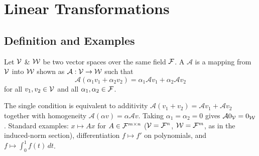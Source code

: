 \section{Linear Transformations}\label{sec:lt}
\subsection{Definition and Examples}\label{ss:lt-def}
\begin{definition}
Let $\mathcal{V}$ \& $\mathcal{W}$ be two vector spaces over the same field $\mathcal{F}$. A  $\mathcal{A}$ is a mapping from $\mathcal{V}$ into $\mathcal{W}$ shown as $\mathcal{A}:\mathcal{V}\to\mathcal{W}$ such that
\[
\mathcal{A}(\alpha_1 v_1 + \alpha_2 v_2) = \alpha_1\mathcal{A}v_1 + \alpha_2\mathcal{A}v_2
\]
for all $v_1,v_2\in\mathcal{V}$ and all $\alpha_1,\alpha_2\in\mathcal{F}$.
\end{definition}
\begin{center}
\end{center}
\begin{insight}
The single condition is equivalent to additivity $\mathcal A(v_1+v_2) = \mathcal Av_1+\mathcal Av_2$ together with homogeneity $\mathcal A(\alpha v) = \alpha\mathcal Av$. Taking $\alpha_1=\alpha_2=0$ gives $\mathcal A 0_{\mathcal{V}} = 0_{\mathcal{W}}$. Standard examples: $x\mapsto Ax$ for $A\in\mathcal{F}^{m\times n}$ ($\mathcal{V}=\mathcal{F}^n$, $\mathcal{W}=\mathcal{F}^m$, as in the induced-norm section), differentiation $f\mapsto f'$ on polynomials, and $f\mapsto\int_0^1 f(t)\,dt$.
\end{insight}

